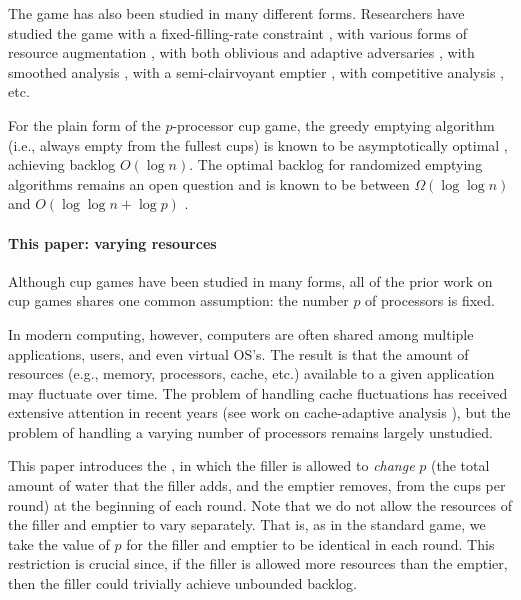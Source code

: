 The game has also been studied in many different forms. Researchers have studied the game with a fixed-filling-rate constraint \cite{BaruahCoPl96,GkasieniecKl17,BaruahGe95,LitmanMo11,LitmanMo05,MoirRa99,BarNi02,GuanYi12,Liu69, LiuLa73}, with various forms of resource augmentation \cite{BenderFaKu19, Kuszmaul20, LitmanMo09, DietzRa91}, with both oblivious and adaptive adversaries \cite{AdlerBeFr03,BaruahCoPl96,Liu69,BenderFaKu19, Kuszmaul20}, with smoothed analysis \cite{Kuszmaul20, BenderFaKu19}, with a semi-clairvoyant emptier \cite{LitmanMo09}, with competitive analysis \cite{Bar-NoyFrLa02, FleischerKo04, DamaschkeZh05}, etc.

For the plain form of the $p$-processor cup game, the greedy
emptying algorithm (i.e., always empty from the fullest cups) is
known to be asymptotically optimal \cite{AdlerBeFr03,
BenderFaKu19, Kuszmaul20}, achieving backlog $O(\log n)$. The
optimal backlog for randomized emptying algorithms remains an
open question \cite{DietzRa91, BenderFaKu19, Kuszmaul20} and is
known to be between $\Omega(\log \log n)$ and $O(\log \log n +
\log p)$ \cite{Kuszmaul20}.

\paragraph{This paper: varying resources}
Although cup games have been studied in many forms, all of the
prior work on cup games shares one common assumption: the number
$p$ of processors is fixed.

In modern computing, however, computers are often shared among
multiple applications, users, and even virtual OS's. The result
is that the amount of resources (e.g., memory, processors, cache,
etc.) available to a given application may fluctuate over time.
The problem of handling cache fluctuations has received extensive
attention in recent years (see work on cache-adaptive analysis
\cite{CA1, CA2, CA3, CA4, CA5}), but the problem of handling a
varying number of processors remains largely unstudied.

This paper introduces the , in
which the filler is allowed to \emph{change} $p$ (the total
amount of water that the filler adds, and the emptier removes,
from the cups per round) at the beginning of each round. Note
that we do not allow the resources of the filler and emptier to
vary separately. That is, as in the standard game, we take the
value of $p$ for the filler and emptier to be identical in each
round. This restriction is crucial since, if the filler is
allowed more resources than the emptier, then the filler could
trivially achieve unbounded backlog.

